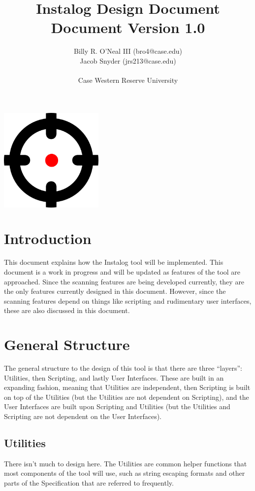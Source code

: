 \documentclass[letterpaper,12pt]{article}
\title{Instalog Design Document \\ Document Version 1.0}
\author{
Billy R. O'Neal III (bro4@case.edu) \\
Jacob Snyder (jrs213@case.edu) \\ \\
Case Western Reserve University
}
\begin{document}
\maketitle
\vspace{1in}
\begin{center}
\includegraphics[width=2in, height=2in]{figures/InstalogLogo.png}
\end{center}
\newpage



\tableofcontents
\newpage



\section{Introduction}
This document explains how the Instalog tool will be implemented.  This document
is a work in progress and will be updated as features of the tool are
approached.  Since the scanning features are being developed currently, they are
the only features currently designed in this document.  However, since the
scanning features depend on things like scripting and rudimentary user
interfaces, these are also discussed in this document.

\newpage

\section{General Structure}
The general structure to the design of this tool is that there are three
``layers'': Utilities, then Scripting, and lastly User Interfaces.  These are
built in an expanding fashion, meaning that Utilities are independent, then
Scripting is built on top of the Utilities (but the Utilities are not dependent
on Scripting), and the User Interfaces are built upon Scripting and Utilities
(but the Utilities and Scripting are not dependent on the User Interfaces).

\subsection{Utilities}
There isn't much to design here.  The Utilities are common helper functions that
most components of the tool will use, such as string escaping formats and other
parts of the Specification that are referred to frequently.  
\end{document}

